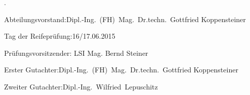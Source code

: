 \begin{titlepage}
	{\color{white}.}
	\bigskip
	\vspace{14cm}
	\noindent%

	Abteilungsvorstand:\hfill Dipl.-Ing.~(FH)\ Mag.\ Dr.techn.\ Gottfried Koppensteiner\\
	\bigskip
	\bigskip

	Tag der Reifeprüfung:\hfill 16/17.06.2015\\
	\bigskip
	\bigskip

	Prüfungsvorsitzender:\hfill
	LSI Mag. Bernd Steiner\\
	\smallskip

	Erster Gutachter:\hfill Dipl.-Ing.~(FH)\ Mag.\ Dr.techn.\ Gottfried Koppensteiner\\
	\smallskip

	Zweiter Gutachter:\hfill 	Dipl.-Ing.\ Wilfried\ Lepuschitz\\
		\smallskip
\end{titlepage}
